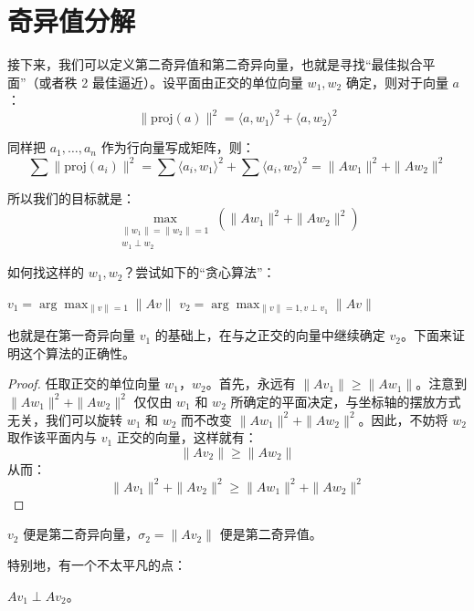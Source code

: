 \section{奇异值分解}

接下来，我们可以定义第二奇异值和第二奇异向量，也就是寻找“最佳拟合平面”（或者秩 2 最佳逼近）。设平面由正交的单位向量 $w_1, w_2$ 确定，则对于向量 $a$：
\[
    \|\text{proj}(a)\|^2 = \langle a, w_1 \rangle^2 + \langle a, w_2 \rangle^2
\]

同样把 $a_1, \dots, a_n$ 作为行向量写成矩阵，则：
\[
    \sum \|\text{proj}(a_i)\|^2 = \sum \langle a_i, w_1 \rangle^2 + \sum \langle a_i, w_2 \rangle^2 = \|Aw_1\|^2 + \|Aw_2\|^2
\]

所以我们的目标就是：
\[
    \max_{\substack{\|w_1\|=\|w_2\|=1 \\ w_1 \perp w_2}} \left( \|Aw_1\|^2 + \|Aw_2\|^2 \right)
\]

如何找这样的 $w_1, w_2$？尝试如下的“贪心算法”：
\begin{algorithm}[h]
    \caption{最佳拟合平面}
    \begin{algorithmic}[1]
        \State $v_1 = \arg\max_{\|v\|=1} \|Av\|$
        \State $v_2 = \arg\max_{\|v\|=1, v \perp v_1} \|Av\|$
    \end{algorithmic}
\end{algorithm}

也就是在第一奇异向量 $v_1$ 的基础上，在与之正交的向量中继续确定 $v_2$。下面来证明这个算法的正确性。

\begin{proof}
    任取正交的单位向量 $w_1$，$w_2$。首先，永远有 $\|Av_1\| \ge \|Aw_1\|$。注意到 $\|Aw_1\|^2 + \|Aw_2\|^2$ 仅仅由 $w_1$ 和 $w_2$ 所确定的平面决定，与坐标轴的摆放方式无关，我们可以旋转 $w_1$ 和 $w_2$ 而不改变 $\|Aw_1\|^2 + \|Aw_2\|^2$。因此，不妨将 $w_2$ 取作该平面内与 $v_1$ 正交的向量，这样就有：
    \[
        \|Av_2\| \ge \|Aw_2\|
    \]
    从而：
    \[
        \|Av_1\|^2 + \|Av_2\|^2 \ge \|Aw_1\|^2 + \|Aw_2\|^2
    \]
\end{proof}

$v_2$ 便是第二奇异向量，$\sigma_2 = \|Av_2\|$ 便是第二奇异值。

特别地，有一个不太平凡的点：
\begin{proposition}
    $Av_1 \perp Av_2$。
\end{proposition}

